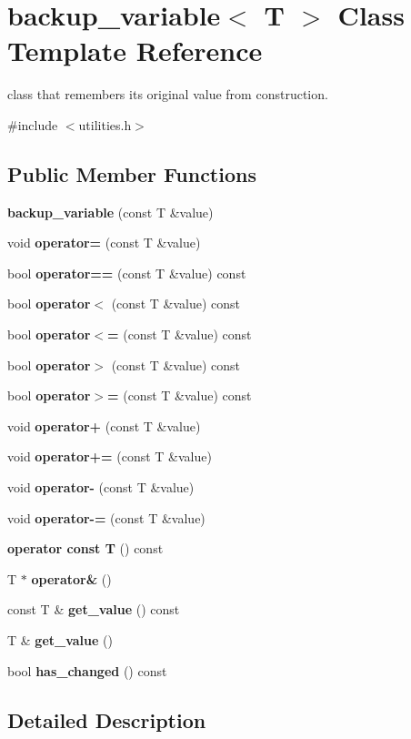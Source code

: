 \section{backup\+\_\+variable$<$ T $>$ Class Template Reference}
\label{classbackup__variable}


class that remembers its original value from construction.  




{\ttfamily \#include $<$utilities.\+h$>$}

\subsection*{Public Member Functions}
\begin{DoxyCompactItemize}
\item 
{\bfseries backup\+\_\+variable} (const T \&value)
\item 
void {\bfseries operator=} (const T \&value)
\item 
bool {\bfseries operator==} (const T \&value) const 
\item 
bool {\bfseries operator$<$} (const T \&value) const 
\item 
bool {\bfseries operator$<$=} (const T \&value) const 
\item 
bool {\bfseries operator$>$} (const T \&value) const 
\item 
bool {\bfseries operator$>$=} (const T \&value) const 
\item 
void {\bfseries operator+} (const T \&value)
\item 
void {\bfseries operator+=} (const T \&value)
\item 
void {\bfseries operator-\/} (const T \&value)
\item 
void {\bfseries operator-\/=} (const T \&value)
\item 
{\bfseries operator const T} () const 
\item 
T $\ast$ {\bfseries operator\&} ()
\item 
const T \& {\bfseries get\+\_\+value} () const 
\item 
T \& {\bfseries get\+\_\+value} ()
\item 
bool {\bfseries has\+\_\+changed} () const 
\end{DoxyCompactItemize}


\subsection{Detailed Description}
